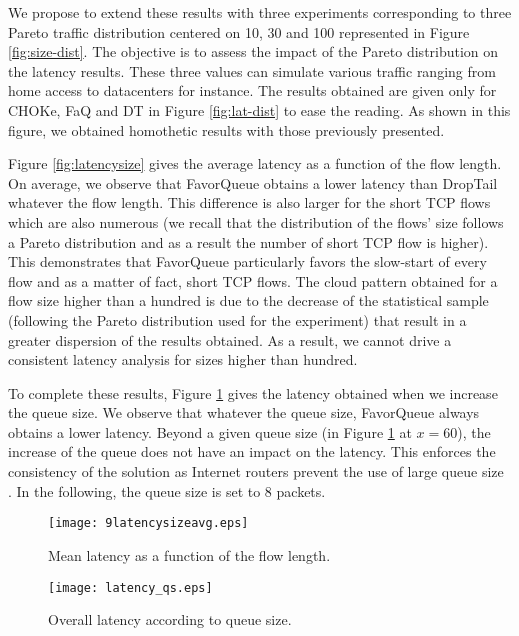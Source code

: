 \documentclass{elsart}
\begin{document}
We propose to extend these results with three experiments corresponding to three Pareto traffic distribution centered on 10, 30 and 100 represented in Figure \ref{fig:size-dist}. The objective is to assess the impact of the Pareto distribution on the latency results. These three values can simulate various traffic ranging from home access to datacenters for instance. The results obtained are given only for CHOKe, FaQ and DT in Figure \ref{fig:lat-dist} to ease the reading. As shown in this figure, we obtained homothetic results with those previously presented.


Figure \ref{fig:latencysize} gives the average latency as a function of the flow length.
On average, we observe that FavorQueue obtains a lower latency than DropTail whatever the flow length. This difference is also larger for the short TCP flows which are also numerous (we recall that the distribution of the flows' size follows a Pareto distribution and as a result the number of short TCP flow is higher). This demonstrates that FavorQueue particularly favors the slow-start of every flow and as a matter of fact, short TCP flows. The cloud pattern obtained for a flow size higher than a hundred is due to the decrease of the statistical sample (following the Pareto distribution used for the experiment) that result in a greater dispersion of the results obtained.
As a result, we cannot drive a consistent latency analysis for sizes higher than hundred.

To complete these results, Figure \ref{fig:latencyqueue} gives the latency obtained when we increase the queue size. We observe that whatever the queue size, FavorQueue always obtains a lower latency. Beyond a given queue size (in Figure \ref{fig:latencyqueue} at $x=60$), the increase of the queue does not have an impact on the latency. 
This enforces the consistency of the solution as Internet routers prevent the use of large queue size \cite{Appenzeller04}. In the following, the queue size is set to $8$ packets.

\begin{figure}[htb!]
   \begin{minipage}[b]{1.0\columnwidth}   
	\centering
	\texttt{[image: 9latencysizeavg.eps]}
	\caption{Mean latency as a function of the flow length.}
	\label{fig:latencysize}
   \end{minipage}

   \begin{minipage}[b]{1.0\columnwidth}
	\centering
	\texttt{[image: latency\_qs.eps]}
	\caption{Overall latency according to queue size.}
	\label{fig:latencyqueue}
   \end{minipage}\hfill
\end{figure}
\end{document}
